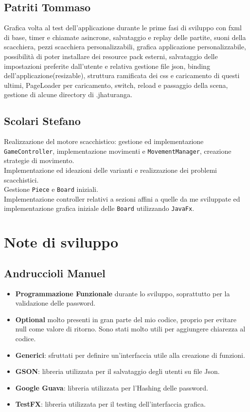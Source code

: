 \documentclass[a4paper,12pt]{report}
\begin{document}
\subsection{Patriti Tommaso}
Grafica volta al test dell'applicazione durante le prime fasi di sviluppo con fxml di base, timer e chiamate asincrone, salvataggio e replay delle partite, suoni della scacchiera, pezzi scacchiera personalizzabili, grafica applicazione personalizzabile, possibilità di poter installare dei resource pack esterni, salvataggio delle impostazioni preferite dall'utente e relativa gestione file json, binding dell'applicazione(resizable), struttura ramificata dei css e caricamento di questi ultimi, PageLoader per caricamento, switch, reload e passaggio della scena, gestione di alcune directory di .jhaturanga.

\subsection{Scolari Stefano}
Realizzazione del motore scacchistico: gestione ed implementazione \texttt{GameController}, implementazione movimenti e \texttt{MovementManager}, creazione strategie di movimento.\\
Implementazione ed ideazioni delle varianti e realizzazione dei problemi scacchistici.\\
Gestione \texttt{Piece} e \texttt{Board} iniziali.\\
Implementazione controller relativi a sezioni affini a quelle da me sviluppate ed implementazione grafica iniziale delle \texttt{Board} utilizzando \texttt{JavaFx}.

\section{Note di sviluppo}

\subsection{Andruccioli Manuel}
\begin{itemize}
\item \textbf{Programmazione Funzionale} durante lo sviluppo, soprattutto per la validazione delle password.

\item \textbf{Optional} molto presenti in gran parte del mio codice, proprio per evitare null come valore di ritorno. Sono stati molto utili per aggiungere chiarezza al codice.

\item \textbf{Generici}: sfruttati per definire un'interfaccia utile alla creazione di funzioni.

\item \textbf{GSON}: libreria utilizzata per il salvataggio degli utenti su file Json.

\item \textbf{Google Guava}: libreria utilizzata per l'Hashing delle password.

\item \textbf{TestFX}: libreria utilizzata per il testing dell'interfaccia grafica.
\end{itemize}
\end{document}
